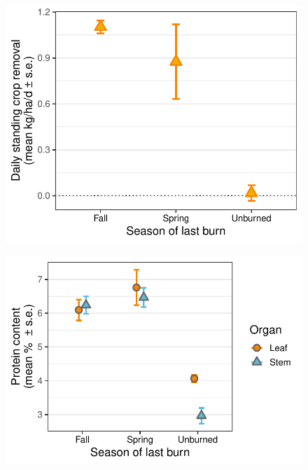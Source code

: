 \documentclass[referee, 
	            sn-basic]
           {sn-jnl}
\begin{document}
\begin{figure}
	\centering
	\includegraphics{removal_gg-1.pdf}
	\caption{ }%
	\label{removal} %
\end{figure}

\begin{figure}
	\centering
	\includegraphics{value_gg-1.pdf}
	\caption{ } %
	\label{value} %
\end{figure}
\end{document}

